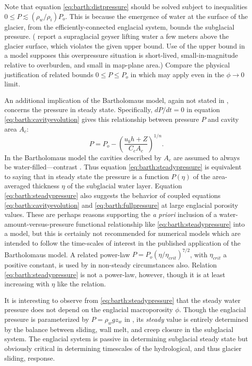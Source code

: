 \documentclass[review,letterpaper]{igs}
\begin{document}
Note that equation \eqref{eq:barth:distpressure} should be solved subject to inequalities $0 \le P \lesssim (\rho_w/\rho_i) P_o$.  This is because the emergence of water at the surface of the glacier, from the efficiently-connected englacial system, bounds the subglacial pressure.  (\cite{Bartholomausetal2011} report a supraglacial geyser lifting water a few meters above the glacier surface, which violates the given upper bound.  Use of the upper bound in a model supposes this overpressure situation is short-lived, small-in-magnitude relative to overburden, and small in map-plane area.)  Compare the physical justification of related bounds $0 \le P \le P_o$ in \cite{Schoofetal2012} which may apply even in the $\phi\to 0$ limit.

An additional implication of the Bartholomaus model, again not stated in \cite{Bartholomausetal2011}, concerns the pressure in steady state.  Specifically, $dP/dt=0$ in equation \eqref{eq:barth:cavityevolution} gives this relationship between pressure $P$ and cavity area $A_c$:
\begin{equation}
P = P_o - \left(\frac{u_b h + Z}{C_c A_c}\right)^{1/n}. \label{eq:barth:steadypressure}
\end{equation}
In the Bartholomaus model the cavities described by $A_c$ are assumed to always be water-filled---contrast \citep{Schoofetal2012}.  Thus equation \eqref{eq:barth:steadypressure} is equivalent to saying that in steady state the pressure is a function $P(\eta)$ of the area-averaged thickness $\eta$ of the subglacial water layer. Equation \eqref{eq:barth:steadypressure} also suggests the behavior of coupled equations \eqref{eq:barth:cavityevolution} and \eqref{eq:barth:fullpressure} at large englacial porosity values.  These are perhaps reasons supporting the \emph{a priori} inclusion of a water-amount-versus-pressure functional relationship like \eqref{eq:barth:steadypressure} into a model, but this is certainly not recommended for numerical models which are intended to follow the time-scales of interest in the published application of the Bartholomaus model.  A related power-law $P = P_o (\eta/\eta_{crit})^{7/2}$, with $\eta_{crit}$ a positive constant, is used by \cite{FlowersClarke2002_theory} in non-steady circumstances also.  Relation \eqref{eq:barth:steadypressure} is not a power-law, however, though it is at least increasing with $\eta$ like the \cite{FlowersClarke2002_theory} relation.

It is interesting to observe from \eqref{eq:barth:steadypressure} that the steady water pressure does not depend on the englacial macroporosity $\phi$.  Though the englacial pressure is parameterized by $P=\rho_w g z_w$ in \cite{Bartholomausetal2011}, its \emph{steady} value is entirely determined by the balance between sliding, wall melt, and creep closure in the subglacial system.  The englacial system is passive in determining subglacial steady state but obviously critical in determining timescales of the hydrological, and thus glacier sliding, response.
\end{document}
